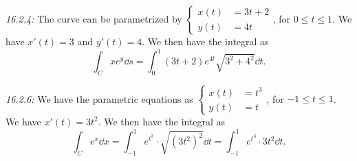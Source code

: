 \documentclass[8pt,twocolumn]{article}
\begin{document}
\begin{Answer}[number=28]
  \emph{16.2.4:} The curve can be parametrized by \(\begin{cases}
    x(t) &= 3t+2\\
    y(t) &= 4t
  \end{cases}\), for $0\le t\le 1$. We have $x'(t) = 3$ and $y'(t) = 4$.
  We then have the integral as
  \[
    \int_C xe^y\dd{s} = \int_0^1 (3t+2)e^{4t}\sqrt{3^2+4^2}\dd{t}.
  \]

  \emph{16.2.6:} We have the parametric equations as \(\begin{cases}
    x(t) &= t^3\\
    y(t) &= t
  \end{cases}\), for $-1\le t\le 1$. We have $x'(t) = 3t^2$.
  We then have the integral as
  \[
    \int_C e^x\dd{x} = \int_{-1}^1 e^{t^3} \cdot \sqrt{(3t^2)^2}\dd{t}= \int_{-1}^1 e^{t^3} \cdot 3t^2\dd{t}.
  \]
\end{Answer}
\end{document}
